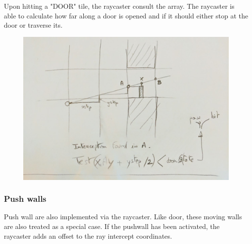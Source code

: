 \par
Upon hitting a "DOOR" tile, the raycaster consult the  array. The raycaster is able to calculate how far along a door is opened and if it should either stop at the door or traverse its.\\

\begin{minipage}{\textwidth}

\end{minipage}

\par 
 \par
\begin{figure}[H]
  \centering
 \includegraphics[width=\textwidth]{imgs/drawings/test_door.png}
\end{figure}
\par












\subsubsection{Push walls} 
Push wall are also implemented via the raycaster. Like door, these moving walls are also treated as a special case. If the pushwall has been activated, the raycaster adds an offset to the ray intercept coordinates.

















